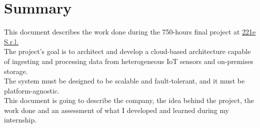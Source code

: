 \cleardoublepage
{}
{}
\begingroup
\let\clearpage\relax
\let\cleardoublepage\relax
\let\cleardoublepage\relax

\chapter*{Summary}

This document describes the work done during the 750-hours final project at \href{https://www.221e.com/about-us}{221e S.r.l.}\\
The project's goal is to architect and develop a cloud-based architecture capable of ingesting and processing data from heterogeneous IoT sensors and on-premises storage.\\
The system must be designed to be scalable and fault-tolerant, and it must be platform-agnostic.\\
This document is going to describe the company, the idea behind the project, the work done and an assessment of what I developed and learned during my internship.\\




\endgroup

\vfill
